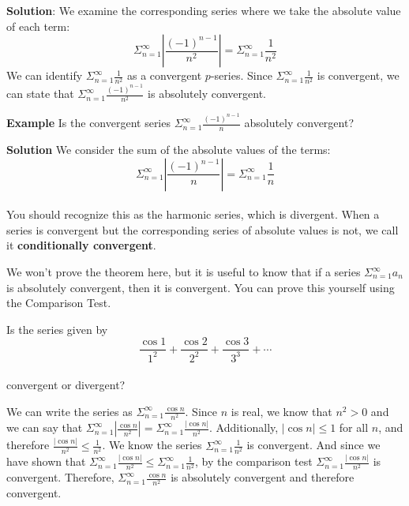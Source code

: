 \textbf{Solution}: We examine the corresponding series where we take the 
absolute value of each term:
$$\Sigma_{n=1}^\infty \left|\frac{(-1)^{n-1}}{n^2} \right| = \Sigma_{n=1}^
\infty \frac{1}{n^2}$$
We can identify $\Sigma_{n=1}^\infty \frac{1}{n^2}$ as a convergent $p$-series. 
Since $\Sigma_{n=1}^\infty \frac{1}{n^2}$ is convergent, we can state that 
$\Sigma_{n=1}^\infty \frac{(-1)^{n-1}}{n^2}$ is absolutely convergent. 

\textbf{Example} Is the convergent series $\Sigma_{n=1}^\infty 
\frac{(-1)^{n-1}}{n}$ absolutely convergent?

\textbf{Solution} We consider the sum of the absolute values of the terms:
$$\Sigma_{n=1}^\infty \left|\frac{(-1)^{n-1}}{n}\right| = \Sigma_{n=1}^\infty 
\frac{1}{n}$$\\
You should recognize this as the harmonic series, which is divergent. When a 
series is convergent but the corresponding series of absolute values is not, 
we call it \textbf{conditionally convergent}. 

We won't prove the theorem here, but it is useful to know that if a series 
$\Sigma_{n=1}^\infty a_n$ is absolutely convergent, then it is convergent. You 
can prove this yourself using the Comparison Test. 

\begin{Exercise}[label = absconv1]
Is the series given by 
$$\frac{\cos{1}}{1^2} + \frac{\cos{2}}{2^2} + \frac{\cos{3}}{3^3} + \cdots$$ \\
convergent or divergent?
\vspace{40mm}
\end{Exercise}

\begin{Answer}[ref = absconv1]
We can write the series as $\Sigma_{n=1}^\infty \frac{\cos{n}}{n^2}$. Since 
$n$ is real, we know that $n^2 > 0$ and we can say that $\Sigma_{n=1}^\infty 
\left| \frac{\cos{n}}{n^2} \right| = \Sigma_{n=1}^\infty \frac{|\cos{n}|}
{n^2}$. Additionally, $|\cos{n}| \leq 1$ for all $n$, and therefore 
$\frac{|\cos{n}|}{n^2} \leq \frac{1}{n^2}$. We know the series $\Sigma_{n=1}^
\infty \frac{1}{n^2}$ is convergent. And since we have shown that $\Sigma_{n=1}
^\infty \frac{|\cos{n}|}{n^2} \leq \Sigma_{n=1}^\infty \frac{1}{n^2}$, by the 
comparison test $\Sigma_{n=1}^\infty \frac{|\cos{n}|}{n^2}$ is convergent. 
Therefore, $\Sigma_{n=1}^\infty \frac{\cos{n}}{n^2}$ is absolutely convergent 
and therefore convergent. 
\end{Answer}

